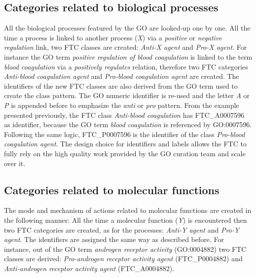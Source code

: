 \documentclass{bioinfo}
\begin{document}
\subsection{Categories related to biological processes}\label{catprocess}
All the biological processes featured by the GO are looked-up one by one. All the 
time a process is linked to another process (\emph{X}) via a \emph{positive} or \emph{negative regulation} link, two FTC 
classes are created: \emph{Anti-X agent} and \emph{Pro-X agent}. For instance the GO term \emph{positive regulation of blood 
coagulation} is linked to the term \emph{blood coagulation} via a \emph{positively regulates} relation, therefore two FTC 
categories \emph{Anti-blood coagulation agent} and \emph{Pro-blood coagulation agent} are created. The identifiers of the 
new FTC classes are also derived from the GO term used to create the class pattern. The GO numeric identifier 
is re-used and the letter \emph{A} or \emph{P} is appended before to emphasize the \emph{anti} or \emph{pro} pattern. 
From the example presented 
previously, the FTC class \emph{Anti-blood coagulation} has FTC\_A0007596 as identifier, because the GO term \emph{blood coagulation} is 
referenced by GO:0007596. Following the same logic, FTC\_P0007596 is the identifier of the class \emph{Pro-blood coagulation agent}. The 
design choice for identifiers and labels allows the FTC to fully rely on the high quality work provided by the GO curation 
team and scale over it.

\subsection{Categories related to molecular functions}\label{catfunc}
The mode and mechanism of actions related to molecular functions are created in the following manner: All the time 
a molecular function (\emph{Y}) is encountered then two FTC categories are created, as for the processes: \emph{Anti-Y agent} and 
\emph{Pro-Y agent}. The identifiers are assigned the same way as described before. For instance, out of the GO term \emph{androgen 
receptor activity} (GO:0004882) two FTC classes are derived: \emph{Pro-androgen receptor activity agent} (FTC\_P0004882) and 
\emph{Anti-androgen receptor activity agent} (FTC\_A0004882).
\end{document}
